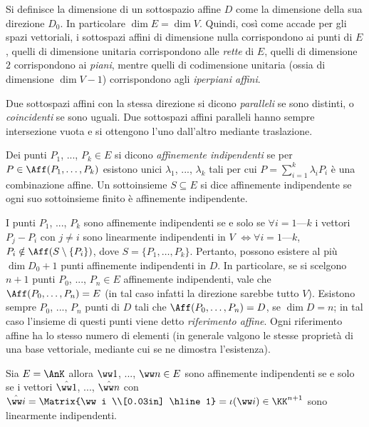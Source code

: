 \documentclass[10pt,landscape]{article}
\begin{document}
\begin{multicols}{3}
        Si definisce la dimensione di un sottospazio affine $D$ come la dimensione della sua direzione $D_0$. In particolare $\dim E = \dim V$. Quindi, così come accade per gli spazi vettoriali, i sottospazi affini di dimensione nulla corrispondono ai punti di $E$, quelli di dimensione unitaria corrispondono alle \textit{rette} di $E$, quelli di dimensione $2$ corrispondono ai \textit{piani}, mentre quelli di codimensione unitaria (ossia di dimensione $\dim V - 1$) corrispondono agli \textit{iperpiani affini}.

        Due sottospazi affini con la stessa direzione si
        dicono \textit{paralleli} se sono distinti, o \textit{coincidenti} se sono uguali. Due sottospazi
        affini paralleli hanno sempre intersezione vuota e si ottengono l'uno dall'altro mediante traslazione.

	    Dei punti $P_1$, ..., $P_k \in E$ si dicono \textit{affinemente indipendenti} se per
	    $P \in \Aff(P_1, \ldots, P_k)$ esistono unici
	    $\lambda_1$, ..., $\lambda_k$ tali per cui
	    $P = \sum_{i=1}^k \lambda_i P_i$ è una combinazione
	    affine. Un sottoinsieme $S \subseteq E$ si dice affinemente indipendente se ogni suo sottoinsieme finito è affinemente indipendente.

        I punti $P_1$, ..., $P_k$ sono affinemente indipendenti se e solo se $\forall i=1\text{---}k$ i vettori $P_j-P_i$ con $j \neq i$ sono linearmente indipendenti in $V$ $\iff \forall i=1\text{---}k$, $P_i \notin \Aff(S \setminus \{P_i\})$,
        dove $S = \{P_1, \ldots, P_k\}$. Pertanto, possono
        esistere al più $\dim D_0 + 1$ punti affinemente
        indipendenti in $D$. In particolare, se si scelgono
        $n+1$ punti $P_0$, ..., $P_n \in E$ affinemente
        indipendenti, vale che $\Aff(P_0, \ldots, P_n) = E$ (in tal caso infatti la direzione sarebbe tutto $V$).
        Esistono sempre $P_0$, ..., $P_n$ punti di $D$ tali
        che $\Aff(P_0, \ldots, P_n) = D$, se $\dim D = n$;
        in tal caso l'insieme di questi punti viene detto
        \textit{riferimento affine}. Ogni riferimento affine ha
        lo stesso numero di elementi (in generale valgono
        le stesse proprietà di una base vettoriale, mediante
        cui se ne dimostra l'esistenza).

        Sia $E = \AnK$ allora $\ww 1$, ..., $\ww n \in E$ sono affinemente indipendenti se e solo se i vettori $\hat{\ww 1}$, ..., $\hat{\ww n}$ con $\hat{\ww i}=\Matrix{\ww i \\[0.03in] \hline 1} = \iota(\ww i) \in \KK^{n+1}$ sono linearmente indipendenti. \\ \vskip 0.05in


\end{multicols}
\end{document}
